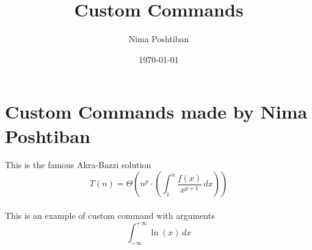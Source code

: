 \documentclass[10pt,a4paper]{article}
\author{Nima Poshtiban}
\date{\today}
\title{Custom Commands}
\newcommand{\akrabazzi}{T(n)=\Theta{\left(n^{p}\cdot \left(\int_{1}^{n}{\frac{f(x)}{x^{p+1}}\,dx}\right)\right)}}
\newcommand{\nima}{Nima Poshtiban}
\newcommand{\intln}[2]{\int_{#1}^{#2}{\ln(x)\,dx}}
\begin{document}
\maketitle

\section{Custom Commands made by {\nima} }
This is the famous Akra-Bazzi solution
\[\akrabazzi\] \\
This is an example of custom command with arguments
\[\intln{-\infty}{+\infty}\]
\end{document}
